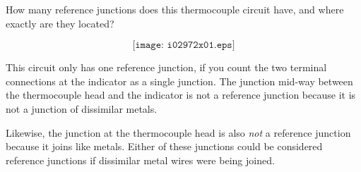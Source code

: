 

How many reference junctions does this thermocouple circuit have, and where exactly are they located?

$$\texttt{[image: i02972x01.eps]}$$







This circuit only has one reference junction, if you count the two terminal connections at the indicator as a single junction.  The junction mid-way between the thermocouple head and the indicator is not a reference junction because it is not a junction of dissimilar metals. 







Likewise, the junction at the thermocouple head is also {\it not} a reference junction because it joins like metals.  Either of these junctions could be considered reference junctions if dissimilar metal wires were being joined.




